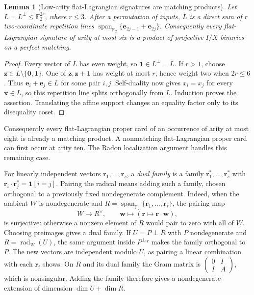 \documentclass[11pt,letterpaper,onecolumn]{article}
\theoremstyle{plain}
\newtheorem{lemma}[lemma]{Lemma}
\theoremstyle{definition}
\theoremstyle{remark}
\newcommand{\Ftwo}{\mathbb F_2}
\newcommand{\Span}{\operatorname{span}}
\newcommand{\one}{\mathbf 1}
\newcommand{\zero}{\mathbf 0}
\begin{document}
\begin{lemma}[Low-arity flat-Lagrangian signatures are matching products]
\label{lem:rm-low-flat-matching}
Let \(L=L^\perp\le\Ftwo^{2r}\), where \(r\le3\).  After a permutation of inputs, \(L\) is a direct sum of \(r\) two-coordinate repetition
lines \(\Span_{\Ftwo}\{{\mathbf{e}}_{2j-1}+{\mathbf{e}}_{2j}\}\).  Consequently
every flat-Lagrangian signature of arity at most six is a product of
projective \(I/X\) binaries on a perfect matching.
\end{lemma}

\begin{proof}
Every vector of \(L\) has even weight, so \(\one\in L^\perp=L\).
If \(r>1\), choose \({\mathbf{z}}\in L\setminus\{\zero,\one\}\).  One of \({\mathbf{z}},{\mathbf{z}}+\one\)
has weight at most \(r\), hence weight two when \(2r\le6\).  Thus
\({\mathbf{e}}_i+{\mathbf{e}}_j\in L\) for some pair \(i,j\).  Self-duality now gives
\(x_i=x_j\) for every \({\mathbf{x}}\in L\), so this repetition line splits
orthogonally from \(L\).  Induction proves the assertion.  Translating the
affine support changes an equality factor only to its disequality coset.
\end{proof}

Consequently every flat-Lagrangian proper card of an occurrence of arity at
most eight is already a matching product.  A nonmatching flat-Lagrangian
proper card can first occur at arity ten. The Radon localization argument
handles this remaining case.

For linearly independent vectors \({\mathbf{r}}_1,\ldots,{\mathbf{r}}_s\), a \emph{dual family}
is a family \({\mathbf{r}}_1^*,\ldots,{\mathbf{r}}_s^*\) with
\({\mathbf{r}}_i\cdot {\mathbf{r}}_j^*=\one[i=j]\).  Pairing the radical means adding such a
family, chosen orthogonal to a previously fixed nondegenerate complement.
Indeed, when the ambient \(W\) is nondegenerate and
\(R=\Span_{\Ftwo}\{{\mathbf{r}}_1,\ldots,{\mathbf{r}}_s\}\), the pairing map
\[
 W\longrightarrow R^\vee,
 \qquad {\mathbf{w}}\longmapsto({\mathbf{r}}\mapsto {\mathbf{r}}\cdot {\mathbf{w}}),
\]
is surjective: otherwise a nonzero element of \(R\) would pair to zero with
all of \(W\).  Choosing preimages gives a dual family.  If
\(U=P\perp R\) with \(P\) nondegenerate and
\(R=\operatorname{rad}_W(U)\), the same argument inside \(P^{\perp_W}\)
makes the family orthogonal to \(P\).  The new vectors are independent
modulo \(U\), as pairing a linear combination with each \({\mathbf{r}}_i\) shows.
On \(R\) and its dual family the Gram matrix is
\(\left(\begin{smallmatrix}0&I\\I&A\end{smallmatrix}\right)\), which is
nonsingular.  Adding the family therefore gives a nondegenerate extension
of dimension \(\dim U+\dim R\).
\end{document}
